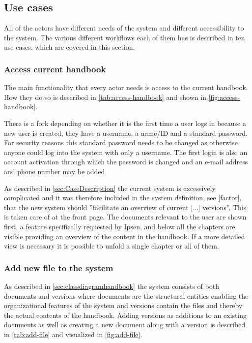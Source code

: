 \subsection{Use cases} \label{sec:usecases}
All of the actors have different needs of the system and different accessibility to the system. The various different workflows each of them has is described in ten use cases, which are covered in this section.

\subsubsection{Access current handbook}

The main functionality that every actor needs is access to the current handbook. How they do so is described in \cref{tab:access-handbook} and shown in \cref{fig:access-handbook}.




There is a fork depending on whether it is the first time a user logs in because a new user is created, they have a username, a name/ID and a standard password.
For security reasons this standard password needs to be changed as otherwise anyone could log into the system with only a username.
The first login is also an account activation through which the password is changed and an e-mail address and phone number may be added.

As described in \cref{sec:CaseDescription} the current system is excessively complicated and it was therefore included in the system definition, see \cref{factor}, that the new system should ''facilitate an overview of current [...] versions''.
This is taken care of at the front page.
The documents relevant to the user are shown first, a feature specifically requested by Ipsen, and below all the chapters are visible providing an overview of the content in the handbook.
If a more detailed view is necessary it is possible to unfold a single chapter or all of them.


\subsubsection{Add new file to the system}
As described in \cref{sec:classdiagramhandbook} the system consists of both documents and versions where documents are the structural entities enabling the organizational features of the system and versions contain the files and thereby the actual contents of the handbook.
Adding versions as additions to an existing documents as well as creating a new document along with a version is described in \cref{tab:add-file} and visualized in \cref{fig:add-file}.

